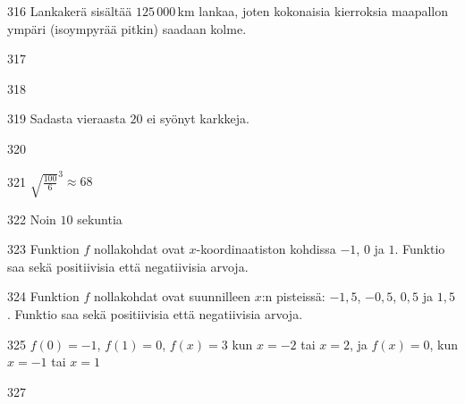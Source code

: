 \begin{Vastaus}{316}
Lankakerä sisältää $125\,000$\,km lankaa, joten kokonaisia kierroksia maapallon ympäri (isoympyrää pitkin) saadaan kolme.
	
\end{Vastaus}
\begin{Vastaus}{317}
	
\end{Vastaus}
\begin{Vastaus}{318}
	
\end{Vastaus}
\begin{Vastaus}{319}
		Sadasta vieraasta $20$ ei syönyt karkkeja.
	
\end{Vastaus}
\begin{Vastaus}{320}
	
\end{Vastaus}
\begin{Vastaus}{321}
		${\sqrt{\frac{100}{6}}}^{3} \approx 68$
	
\end{Vastaus}
\begin{Vastaus}{322}
        Noin $10$ sekuntia
    
\end{Vastaus}
\begin{Vastaus}{323}
Funktion $f$ nollakohdat ovat $x$-koordinaatiston kohdissa $-1$, $0$ ja $1$. Funktio saa sekä positiivisia että negatiivisia arvoja.
\end{Vastaus}
\begin{Vastaus}{324}
Funktion $f$ nollakohdat ovat suunnilleen $x$:n pisteissä: $-1,5$, $-0,5$, $0,5$ ja $1,5$. Funktio saa sekä positiivisia että negatiivisia arvoja.
	
\end{Vastaus}
\begin{Vastaus}{325}
 $f(0)=-1$, $f(1)=0$, $f(x)=3$ kun $x=-2$ tai $x=2$, ja $f(x)=0$, kun $x=-1$ tai $x=1$
\end{Vastaus}
\begin{Vastaus}{327}
  
\end{Vastaus}
